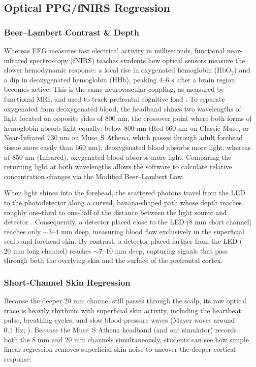 \documentclass[11pt]{article}
\begin{document}
\subsection{Optical PPG/fNIRS Regression}

\subsubsection{Beer--Lambert Contrast \& Depth}
Whereas EEG measures fast electrical activity in milliseconds, functional near-infrared spectroscopy (fNIRS) teaches students how optical sensors measure the slower hemodynamic response: a local rise in oxygenated hemoglobin ($\text{HbO}_2$) and a dip in deoxygenated hemoglobin ($\text{HHb}$), peaking $4\text{--}6\text{ s}$ after a brain region becomes active. This is the same neurovascular coupling, as measured by functional MRI, and used to track prefrontal cognitive load \citep{delpy1988estimation,scholkmann2014review,russo2025fnirs}. To separate oxygenated from deoxygenated blood, the headband shines two wavelengths of light located on opposite sides of $800\text{ nm}$, the crossover point where both forms of hemoglobin absorb light equally: below $800\text{ nm}$ (Red $660\text{ nm}$ on Classic Muse, or Near-Infrared $730\text{ nm}$ on Muse~S Athena, which passes through adult forehead tissue more easily than $660\text{ nm}$), deoxygenated blood absorbs more light, whereas at $850\text{ nm}$ (Infrared), oxygenated blood absorbs more light. Comparing the returning light at both wavelengths allows the software to calculate relative concentration changes via the Modified Beer--Lambert Law.

When light shines into the forehead, the scattered photons travel from the LED to the photodetector along a curved, banana-shaped path whose depth reaches roughly one-third to one-half of the distance between the light source and detector \citep{delpy1988estimation,saager2005direct,wyser2020short}. Consequently, a detector placed close to the LED ($8\text{ mm}$ short channel) reaches only $\sim 3\text{--}4\text{ mm}$ deep, measuring blood flow exclusively in the superficial scalp and forehead skin. By contrast, a detector placed farther from the LED ($20\text{ mm}$ long channel) reaches $\sim 7\text{--}10\text{ mm}$ deep, capturing signals that pass through both the overlying skin and the surface of the prefrontal cortex.

\subsubsection{Short-Channel Skin Regression}
Because the deeper $20\text{ mm}$ channel still passes through the scalp, its raw optical trace is heavily rhythmic with superficial skin activity, including the heartbeat pulse, breathing cycles, and slow blood-pressure waves (Mayer waves around $0.1\text{ Hz}$; \citealp{scholkmann2014review,wyser2020short}). Because the Muse~S Athena headband (and our simulator) records both the $8\text{ mm}$ and $20\text{ mm}$ channels simultaneously, students can see how simple linear regression removes superficial skin noise to uncover the deeper cortical response:
\end{document}
